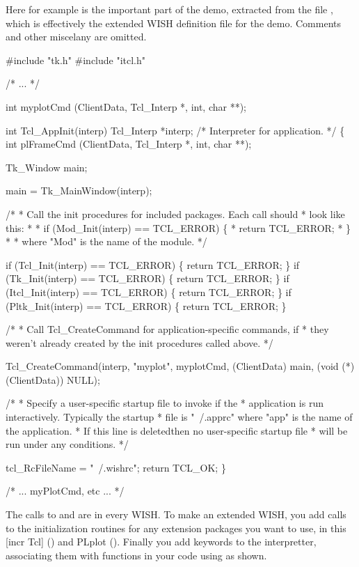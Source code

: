 Here for example is the important part of the  demo,
extracted from the file , which is effectively the
extended WISH definition file for the  demo.  Comments and
other miscelany are omitted.
\begin{example}
#include "tk.h"
#include "itcl.h"

/* ... */

int   myplotCmd        (ClientData, Tcl_Interp *, int, char **);

int
Tcl_AppInit(interp)
    Tcl_Interp *interp;		/* Interpreter for application. */
\{
int   plFrameCmd        (ClientData, Tcl_Interp *, int, char **);

    Tk_Window main;

    main = Tk_MainWindow(interp);

    /*
     * Call the init procedures for included packages.  Each call should
     * look like this:
     *
     * if (Mod_Init(interp) == TCL_ERROR) \{
     *     return TCL_ERROR;
     * \}
     *
     * where "Mod" is the name of the module.
     */

    if (Tcl_Init(interp) == TCL_ERROR) \{
        return TCL_ERROR;
    \}
    if (Tk_Init(interp) == TCL_ERROR) \{
        return TCL_ERROR;
    \}
    if (Itcl_Init(interp) == TCL_ERROR) \{
        return TCL_ERROR;
    \}
    if (Pltk_Init(interp) == TCL_ERROR) \{
        return TCL_ERROR;
    \}

    /*
     * Call Tcl_CreateCommand for application-specific commands, if
     * they weren't already created by the init procedures called above.
     */

    Tcl_CreateCommand(interp, "myplot", myplotCmd,
                      (ClientData) main, (void (*)(ClientData)) NULL);


    /*
     * Specify a user-specific startup file to invoke if the
     * application is run interactively.  Typically the startup
     * file is "~/.apprc" where "app" is the name of the application.
     * If this line is deletedthen no user-specific startup file
     * will be run under any conditions.
     */

    tcl_RcFileName = "~/.wishrc";
    return TCL_OK;
\}

/* ... myPlotCmd, etc ... */
\end{example}

The calls to  and  are in every WISH.
To make an extended WISH, you add calls to the initialization routines
for any extension packages you want to use, in this [incr Tcl]
() and PLplot ().  Finally you add
keywords to the interpretter, associating them with functions in your
code using  as shown.


